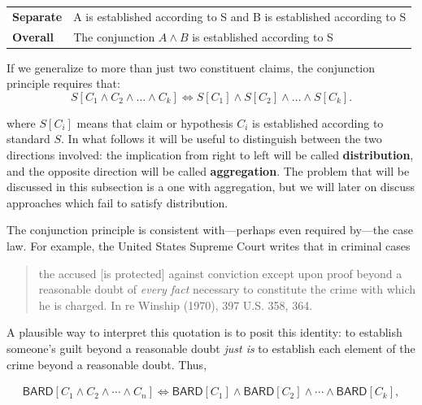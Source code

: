 \documentclass[
  10pt,
  dvipsnames,enabledeprecatedfontcommands]{scrartcl}
\newcommand{\et}{\wedge}
\begin{document}
\begin{center}
\begin{tabular}
{@{}ll@{}}
\toprule
\textbf{Separate} &   A is established according to S and B is established according to S\\   
\textbf{Overall}  &   The conjunction $A \et B$ is established according to S  \\ 
\bottomrule
\end{tabular}
\end{center}

\noindent If we generalize to more than just two constituent claims, the
conjunction principle requires
that:
\[S[C_1 \wedge C_2  \wedge \dots \wedge  C_k] \Leftrightarrow S[C_1] \wedge S[C_2]  \wedge \dots \wedge  S[C_k].\]

\noindent where \(S[C_i]\) means that claim or hypothesis \(C_i\) is
established according to standard \(S\). In what follows it will be
useful to distinguish between the two directions involved: the
implication from right to left will be called \textbf{distribution}, and
the opposite direction will be called \textbf{aggregation}. The problem
that will be discussed in this subsection is a one with aggregation, but
we will later on discuss approaches which fail to satisfy distribution.

The conjunction principle is consistent with---perhaps even required
by---the case law. For example, the United States Supreme Court writes
that in criminal cases

\begin{quote}
the accused [is protected] against conviction except upon proof beyond a reasonable doubt of \textit{every fact} necessary to constitute the crime with which he is charged.  In re Winship (1970), 397 U.S. 358, 364. 
\end{quote}

\noindent A plausible way to interpret this quotation is to posit this
identity: to establish someone's guilt beyond a reasonable doubt
\textit{just is} to establish each element of the crime beyond a
reasonable doubt. Thus,

\begin{align*}\mathsf{BARD}[C_1 \wedge C_2   \wedge \cdots \wedge C_n] \Leftrightarrow \mathsf{BARD}[C_1] \wedge \mathsf{BARD}[C_2]  \wedge \cdots \wedge \mathsf{BARD}[C_k],
\end{align*}
\end{document}
